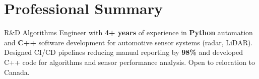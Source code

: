 \section*{Professional Summary}
\begin{center}
    \begin{minipage}{0.97\textwidth}
        \small{R\&D Algorithms Engineer with \textbf{4+ years} of experience in \textbf{Python} automation and \textbf{C++} software development for automotive sensor systems (radar, LiDAR). Designed CI/CD pipelines reducing manual reporting by \textbf{98\%} and developed C++ code for algorithms and sensor performance analysis. Open to relocation to Canada.}
    \end{minipage}
\end{center}
\vspace{-5pt}
